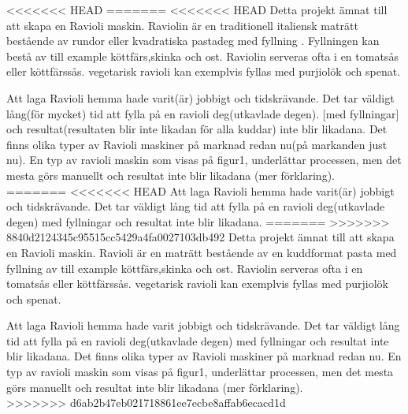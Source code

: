 <<<<<<< HEAD
=======
<<<<<<< HEAD
Detta projekt  ämnat till att skapa en Ravioli maskin. Raviolin är en traditionell italiensk maträtt bestående av rundor eller kvadratiska pastadeg med fyllning \cite{engproc}. Fyllningen kan bestå av till example köttfärs,skinka och ost. Raviolin serveras ofta i en tomatsås eller köttfärssås. vegetarisk ravioli kan exemplvis fyllas med purjiolök och spenat. 

Att laga Ravioli hemma hade varit(är) jobbigt och tidskrävande. Det tar väldigt lång(för mycket) tid att fylla på en ravioli deg(utkavlade degen). [med fyllningar] och resultat(resultaten blir inte likadan för alla kuddar) inte blir likadana.
Det finns olika typer av Ravioli maskiner på marknad redan nu(på markanden just nu). En typ av ravioli maskin som visas på figur1, underlättar processen, men det mesta görs manuellt och resultat inte blir likadana (mer förklaring).\\
=======
<<<<<<< HEAD
Att laga Ravioli hemma hade varit(är) jobbigt och tidskrävande. Det tar väldigt lång tid att fylla på en ravioli deg(utkavlade degen) med fyllningar och resultat inte blir likadana.
=======
>>>>>>> 8840d2124345c95515cc5429a4fa0027103db492
Detta projekt  ämnat till att skapa en Ravioli maskin. Ravioli är en maträtt bestående av en kuddformat pasta med fyllning av till example köttfärs,skinka och ost. Raviolin serveras ofta i en tomatsås eller köttfärssås. vegetarisk ravioli kan exemplvis fyllas med purjiolök och spenat. 

Att laga Ravioli hemma hade varit jobbigt och tidskrävande. Det tar väldigt lång tid att fylla på en ravioli deg(utkavlade degen) med fyllningar och resultat inte blir likadana.
Det finns olika typer av Ravioli maskiner på marknad redan nu. En typ av ravioli maskin som visas på figur1, underlättar processen, men det mesta görs manuellt och resultat inte blir likadana (mer förklaring).\\
>>>>>>> d6ab2b47eb021718861ee7ecbe8affab6ecacd1d

